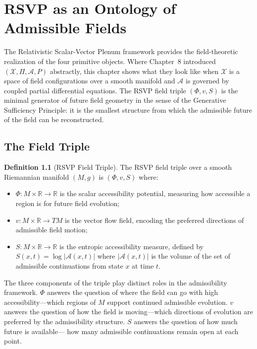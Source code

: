 \documentclass[12pt, oneside]{book}
\theoremstyle{flyxion}
\theoremstyle{definition}
\newtheorem{definition}[theorem]{Definition}
\begin{document}
\chapter{RSVP as an Ontology of Admissible Fields}

The Relativistic Scalar-Vector Plenum framework provides
the field-theoretic realization of the four primitive
objects. Where Chapter~8 introduced $(\mathcal{X}, \Pi,
\mathcal{A}, P)$ abstractly, this chapter shows what they
look like when $\mathcal{X}$ is a space of field
configurations over a smooth manifold and $\mathcal{A}$
is governed by coupled partial differential equations.
The RSVP field triple $(\Phi, v, S)$ is the minimal
generator of future field geometry in the sense of the
Generative Sufficiency Principle: it is the smallest
structure from which the admissible future of the field
can be reconstructed.

\section{The Field Triple}

\begin{definition}[RSVP Field Triple]
The RSVP field triple over a smooth Riemannian manifold
$(M, g)$ is $(\Phi, v, S)$ where:
\begin{itemize}
\item $\Phi : M \times \mathbb{R} \to \mathbb{R}$ is the
      scalar accessibility potential, measuring how
      accessible a region is for future field evolution;
\item $v : M \times \mathbb{R} \to TM$ is the vector
      flow field, encoding the preferred directions of
      admissible field motion;
\item $S : M \times \mathbb{R} \to \mathbb{R}$ is the
      entropic accessibility measure, defined by
      $S(x,t) = \log|\mathcal{A}(x,t)|$ where
      $|\mathcal{A}(x,t)|$ is the volume of the set of
      admissible continuations from state $x$ at time $t$.
\end{itemize}
\end{definition}

The three components of the triple play distinct roles
in the admissibility framework. $\Phi$ answers the
question of where the field can go with high
accessibility---which regions of $M$ support continued
admissible evolution. $v$ answers the question of how
the field is moving---which directions of evolution
are preferred by the admissibility structure. $S$
answers the question of how much future is available---
how many admissible continuations remain open at each
point.
\end{document}
